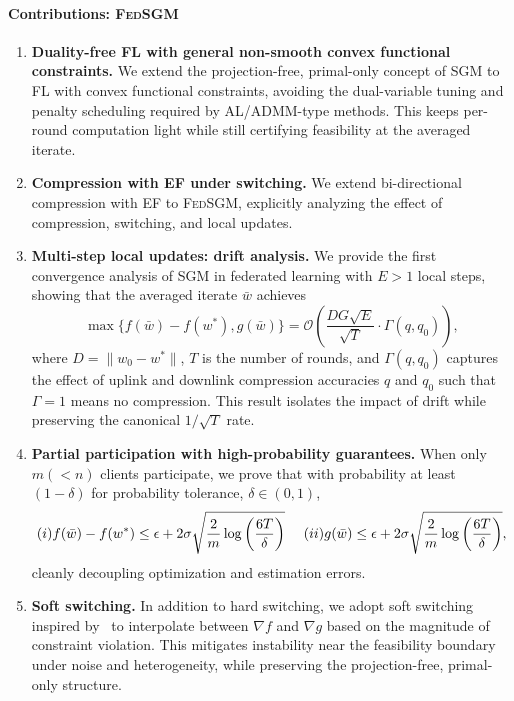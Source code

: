 \documentclass{article} %
\def\bigO{{\mathcal{O}}}
\begin{document}
\paragraph{Contributions: \textsc{FedSGM}}
\begin{enumerate}[leftmargin=*]
    \item \textbf{Duality-free FL with general non-smooth convex functional constraints.}  
    We extend the projection-free, primal-only concept of SGM to FL with convex functional constraints, avoiding the dual-variable tuning and penalty scheduling required by AL/ADMM-type methods. This keeps per-round computation light while still certifying feasibility at the averaged iterate.

    \item \textbf{Compression with EF under switching.}  
    We extend bi-directional compression with EF to \textsc{FedSGM}, explicitly analyzing the effect of compression, switching, and local updates.

    \item \textbf{Multi-step local updates: drift analysis.}  
    We provide the first convergence analysis of SGM in federated learning with $E>1$ local steps, showing that the averaged iterate $\bar{w}$ achieves
    $$
    \max\Big\{f(\bar{w})-f(w^\ast),g(\bar{w})\Big\}=\mathcal{O}\!\left(\frac{DG\sqrt{E}}{\sqrt{T}} \cdot \Gamma(q,q_0)\right),
    $$
    where $D = \|w_0 - w^*\|$, $T$ is the number of rounds, and $\Gamma(q,q_0)$ captures the effect of uplink and downlink compression accuracies $q$ and $q_0$ such that $\Gamma = 1$ means no compression. This result isolates the impact of drift while preserving the canonical $1/\sqrt{T}$ rate.

    \item \textbf{Partial participation with high-probability guarantees.}  
    When only $m(<n)$ clients participate, we prove that with probability at least $(1-\delta)$ for probability tolerance, $\delta \in (0,1)$,
    $$
    (\romannumeral 1)f(\bar w)-f(w^\ast) \leq \epsilon + 2\sigma\sqrt{\frac{2}{m} \log\left(\frac{6T}{\delta}\right)}\ \quad
     (\romannumeral 2) g(\bar w) 
    \leq
    \epsilon + 2\sigma\sqrt{\frac{2}{m} \log\left(\frac{6T}{\delta}\right)},
    $$
    cleanly decoupling optimization and estimation errors.

    \item \textbf{Soft switching.}  
    In addition to hard switching, we adopt {soft switching} inspired by~\citet{upadhyay2025optimization} to interpolate between $\nabla f$ and $\nabla g$ based on the magnitude of constraint violation. This mitigates instability near the feasibility boundary under noise and heterogeneity, while preserving the projection-free, primal-only structure.
\end{enumerate}
\end{document}
